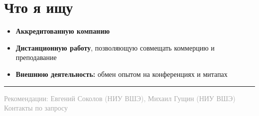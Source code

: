 \documentclass[a4paper,10pt]{article}
\begin{document}
\section{Что я ищу}
\begin{itemize}
    \item \textbf{Аккредитованную компанию}
    \item \textbf{Дистанционную работу}, позволяющую совмещать коммерцию и преподавание
    \item \textbf{Внешнюю деятельность:} обмен опытом на конференциях и митапах
\end{itemize}

\vspace{8pt}
\hrule
\vspace{6pt}
\begin{center}
    \textcolor{darkgray}{\small Рекомендации: Евгений Соколов (НИУ ВШЭ), Михаил Гущин (НИУ ВШЭ)\\Контакты по запросу}
\end{center}
\end{document}
